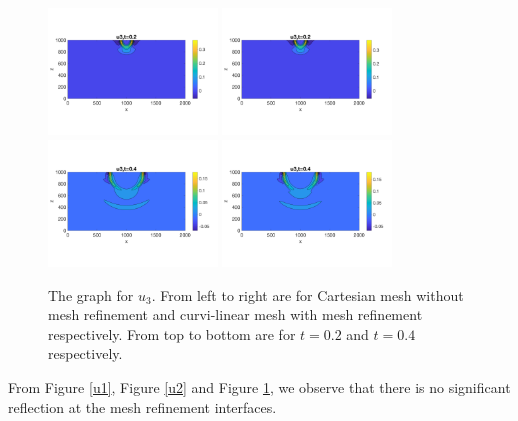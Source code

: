 \begin{figure}[htbp]
	\centering
	\includegraphics[width=0.4\textwidth,trim={0 2.8cm 0 2.8cm}, clip]{u3_t02_cartesian.png}
	\includegraphics[width=0.4\textwidth,trim={0 2.8cm 0 2.8cm}, clip]{u3_t02_curvi_mr.png}\\
	\includegraphics[width=0.4\textwidth,trim={0 2.8cm 0 2.8cm}, clip]{u3_t04_cartesian.png}
	\includegraphics[width=0.4\textwidth,trim={0 2.8cm 0 2.8cm}, clip]{u3_t04_curvi_mr.png}
	\caption{The graph for $u_3$. From left to right are for Cartesian mesh without mesh refinement and curvi-linear mesh with mesh refinement respectively. From top to bottom are for $t = 0.2$ and $t = 0.4$ respectively.}\label{u3}
\end{figure}
From Figure \ref{u1}, Figure \ref{u2} and Figure \ref{u3}, we observe that there is no significant reflection at the mesh refinement interfaces.